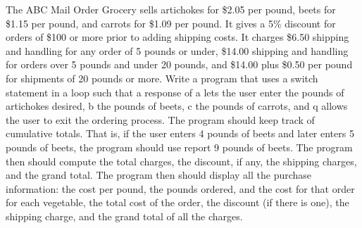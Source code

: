 \begin{question}
   The ABC Mail Order Grocery sells artichokes for \$2.05 per pound, beets for \$1.15 per
   pound, and carrots for \$1.09 per pound. It gives a 5\% discount for orders of \$100 or
   more prior to adding shipping costs. It charges \$6.50 shipping and handling for any
   order of 5 pounds or under, \$14.00 shipping and handling for orders over 5 pounds
   and under 20 pounds, and \$14.00 plus \$0.50 per pound for shipments of 20 pounds or
   more. Write a program that uses a switch statement in a loop such that a response of a
   lets the user enter the pounds of artichokes desired, b the pounds of beets, c the pounds
   of carrots, and q allows the user to exit the ordering process. The program should keep
   track of cumulative totals. That is, if the user enters 4 pounds of beets and later enters
   5 pounds of beets, the program should use report 9 pounds of beets. The program then
   should compute the total charges, the discount, if any, the shipping charges, and the
   grand total. The program then should display all the purchase information: the cost per
   pound, the pounds ordered, and the cost for that order for each vegetable, the total cost
   of the order, the discount (if there is one), the shipping charge, and the grand total of all
   the charges.
\end{question}
